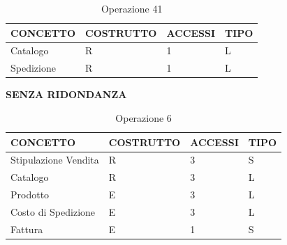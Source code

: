 \begin{table}[H]
\centering
\caption{Operazione 41}
\begin{tabular}{llll}
\\ \hline
\multicolumn{1}{|l|}{\textbf{CONCETTO}} & \multicolumn{1}{l|}{\textbf{COSTRUTTO}} & \multicolumn{1}{l|}{\textbf{ACCESSI}} & \multicolumn{1}{l|}{\textbf{TIPO}} \\ \hline
\multicolumn{1}{|l|}{Catalogo}
& \multicolumn{1}{l|}{R}                  & \multicolumn{1}{l|}{1}                & \multicolumn{1}{l|}{L}             \\ \hline
\multicolumn{1}{|l|}{Spedizione}
& \multicolumn{1}{l|}{R}                  & \multicolumn{1}{l|}{1}                & \multicolumn{1}{l|}{L}             \\ \hline
\end{tabular}
\end{table}

\vspace{1cm}
\centerline{\textbf{SENZA RIDONDANZA}}

\begin{table}[H]
\centering
\caption{Operazione 6}
\begin{tabular}{llll}
\\ \hline
\multicolumn{1}{|l|}{\textbf{CONCETTO}} & \multicolumn{1}{l|}{\textbf{COSTRUTTO}} & \multicolumn{1}{l|}{\textbf{ACCESSI}} & \multicolumn{1}{l|}{\textbf{TIPO}} \\ \hline
\multicolumn{1}{|l|}{Stipulazione Vendita}
& \multicolumn{1}{l|}{R}                  & \multicolumn{1}{l|}{3}                & \multicolumn{1}{l|}{S}             \\ \hline
\multicolumn{1}{|l|}{Catalogo}             & \multicolumn{1}{l|}{R}                  & \multicolumn{1}{l|}{3}
& \multicolumn{1}{l|}{L}
			 \\ \hline
\multicolumn{1}{|l|}{Prodotto}             & \multicolumn{1}{l|}{E}                  & \multicolumn{1}{l|}{3}
& \multicolumn{1}{l|}{L}
			 \\ \hline
\multicolumn{1}{|l|}{Costo di Spedizione}     & \multicolumn{1}{l|}{E}                  & \multicolumn{1}{l|}{3}      & \multicolumn{1}{l|}{L}
			 \\ \hline
\multicolumn{1}{|l|}{Fattura}
& \multicolumn{1}{l|}{E}                  & \multicolumn{1}{l|}{1}                & \multicolumn{1}{l|}{S}             \\ \hline
\end{tabular}
\end{table}

